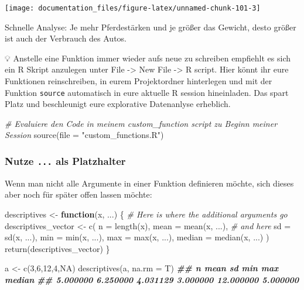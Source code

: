 \documentclass[
]{article}
\newenvironment{Shaded}{\begin{snugshade}}{\end{snugshade}}
\newcommand{\AttributeTok}[1]{\textcolor[rgb]{0.77,0.63,0.00}{#1}}
\newcommand{\CommentTok}[1]{\textcolor[rgb]{0.56,0.35,0.01}{\textit{#1}}}
\newcommand{\ConstantTok}[1]{\textcolor[rgb]{0.00,0.00,0.00}{#1}}
\newcommand{\ControlFlowTok}[1]{\textcolor[rgb]{0.13,0.29,0.53}{\textbf{#1}}}
\newcommand{\DecValTok}[1]{\textcolor[rgb]{0.00,0.00,0.81}{#1}}
\newcommand{\DocumentationTok}[1]{\textcolor[rgb]{0.56,0.35,0.01}{\textbf{\textit{#1}}}}
\newcommand{\FunctionTok}[1]{\textcolor[rgb]{0.00,0.00,0.00}{#1}}
\newcommand{\NormalTok}[1]{#1}
\newcommand{\OtherTok}[1]{\textcolor[rgb]{0.56,0.35,0.01}{#1}}
\newcommand{\StringTok}[1]{\textcolor[rgb]{0.31,0.60,0.02}{#1}}
\begin{document}
\begin{center}\texttt{[image: documentation\_files/figure-latex/unnamed-chunk-101-3]} \end{center}

Schnelle Analyse: Je mehr Pferdestärken und je größer das Gewicht, desto größer ist auch der Verbrauch des Autos.

💡 Anstelle eine Funktion immer wieder aufs neue zu schreiben empfiehlt es sich ein R Skript anzulegen unter File -\textgreater{} New File -\textgreater{} R script. Hier könnt ihr eure Funktionen reinschreiben, in eurem Projektordner hinterlegen und mit der Funktion \texttt{source} automatisch in eure aktuelle R session hineinladen. Das spart Platz und beschleunigt eure explorative Datenanlyse erheblich.

\begin{Shaded}
\begin{Highlighting}[]
\CommentTok{\# Evaluiere den Code in meinem \textasciigrave{}custom\_function\textasciigrave{} script zu Beginn meiner Session}
\FunctionTok{source}\NormalTok{(}\AttributeTok{file =} \StringTok{"custom\_functions.R"}\NormalTok{)}
\end{Highlighting}
\end{Shaded}

\hypertarget{nutze-...-als-platzhalter}{%
\subsubsection{\texorpdfstring{Nutze \texttt{...} als Platzhalter}{Nutze ... als Platzhalter}}\label{nutze-...-als-platzhalter}}

Wenn man nicht alle Argumente in einer Funktion definieren möchte, sich dieses aber noch für später offen lassen möchte:

\begin{Shaded}
\begin{Highlighting}[]
\NormalTok{descriptives }\OtherTok{\textless{}{-}} \ControlFlowTok{function}\NormalTok{(x, ...) \{ }\CommentTok{\# Here is where the additional arguments go}
\NormalTok{  descriptives\_vector }\OtherTok{\textless{}{-}} \FunctionTok{c}\NormalTok{(}
    \AttributeTok{n =} \FunctionTok{length}\NormalTok{(x),}
    \AttributeTok{mean =} \FunctionTok{mean}\NormalTok{(x, ...), }\CommentTok{\# and here}
    \AttributeTok{sd =} \FunctionTok{sd}\NormalTok{(x, ...),     }
    \AttributeTok{min =} \FunctionTok{min}\NormalTok{(x, ...),   }
    \AttributeTok{max =} \FunctionTok{max}\NormalTok{(x, ...),}
    \AttributeTok{median =} \FunctionTok{median}\NormalTok{(x, ...)}
\NormalTok{  )}
  \FunctionTok{return}\NormalTok{(descriptives\_vector)}
\NormalTok{\}}

\NormalTok{a }\OtherTok{\textless{}{-}} \FunctionTok{c}\NormalTok{(}\DecValTok{3}\NormalTok{,}\DecValTok{6}\NormalTok{,}\DecValTok{12}\NormalTok{,}\DecValTok{4}\NormalTok{,}\ConstantTok{NA}\NormalTok{)}
\FunctionTok{descriptives}\NormalTok{(a, }\AttributeTok{na.rm =}\NormalTok{ T)}
\DocumentationTok{\#\#         n      mean        sd       min       max    median }
\DocumentationTok{\#\#  5.000000  6.250000  4.031129  3.000000 12.000000  5.000000}
\end{Highlighting}
\end{Shaded}
\end{document}
